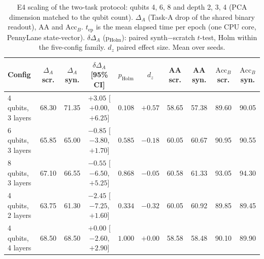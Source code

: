\begin{table}[ht]
\centering
\small
\setlength{\tabcolsep}{4pt}
\caption{E4 scaling of the two-task protocol: qubits {4, 6, 8} and depth {2, 3, 4} (PCA dimension matched to the qubit count). $\Delta_A$ (Task-A drop of the shared binary readout), AA and $\text{Acc}_B$. $t_{\text{ep}}$ is the mean elapsed time per epoch (one CPU core, PennyLane state-vector). $\delta\Delta_A$ (p$_{\text{Holm}}$): paired synth$-$scratch $t$-test, Holm within the five-config family. $d_z$ paired effect size. Mean over seeds.}
\label{tab:e234_scaling}
\begin{tabular}{lccccccccc}
\toprule
Config & $\Delta_A$ scr. & $\Delta_A$ syn. & $\delta\Delta_A$ [95\% CI] & $p_{\text{Holm}}$ & $d_z$ & AA scr. & AA syn. & $\text{Acc}_B$ scr. & $\text{Acc}_B$ syn. \\
\midrule
4 qubits, 3 layers & 68.30 & 71.35 & $+3.05$ [$+0.00$, $+6.25$] & $0.108$ & $+0.57$ & 58.65 & 57.38 & 89.60 & 90.05 \\
6 qubits, 3 layers & 65.85 & 65.00 & $-0.85$ [$-3.80$, $+1.70$] & $0.585$ & $-0.18$ & 60.05 & 60.67 & 90.95 & 90.55 \\
8 qubits, 3 layers & 67.10 & 66.55 & $-0.55$ [$-6.50$, $+5.25$] & $0.868$ & $-0.05$ & 60.58 & 61.33 & 93.05 & 94.30 \\
4 qubits, 2 layers & 63.75 & 61.30 & $-2.45$ [$-7.25$, $+1.60$] & $0.334$ & $-0.32$ & 60.05 & 60.92 & 89.85 & 89.45 \\
4 qubits, 4 layers & 68.50 & 68.50 & $+0.00$ [$-2.60$, $+2.90$] & $1.000$ & $+0.00$ & 58.58 & 58.48 & 90.10 & 89.90 \\
\bottomrule
\end{tabular}
\end{table}
